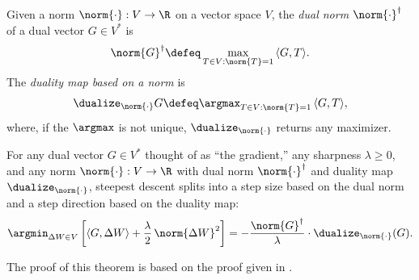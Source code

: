 \begin{definitionbox}
    \label{def:dual-norm-and-duality-map}
    Given a norm $\norm{\cdot}:V\to\R$ on a vector space $V$, the \textit{dual norm} $\norm{\cdot}^\dagger$ of a dual vector $G \in V^\ast$ is
    \begin{equation*}
    \norm{G}^\dagger \defeq \max_{T\in V:\norm{T}=1} \, \langle G, T \rangle.
    \end{equation*}
    The \textit{duality map based on a norm} is
    \begin{equation*}
    \dualize_{\norm{\cdot}} G \defeq \argmax_{T\in V:\norm{T}=1} \, \langle G, T \rangle,
    \end{equation*}
    where, if the $\argmax$ is not unique, $\dualize_{\norm{\cdot}}$ returns any maximizer.
\end{definitionbox}

\begin{theorembox}
    \label{theorem:steepest}
    For any dual vector $G \in V^\ast$ thought of as ``the gradient,'' any sharpness $\lambda \geq 0$, and any norm $\norm{\cdot}: V \to \R$ with dual norm $\norm{\cdot}^\dagger$ and duality map $\dualize_{\norm{\cdot}}$, steepest descent splits into a step size based on the dual norm and a step direction based on the duality map:
\begin{gather*}\label{eq:dual-steepest}
    \argmin_{\Delta W \in V} \left[ \langle G, \Delta W \rangle + \frac{\lambda}{2} \, \norm{\Delta W}^2 \right] = - \frac{\norm{G}^\dagger}{\lambda} \cdot \dualize_{\norm{\cdot}} (G).
\end{gather*}
\end{theorembox}

The proof of this theorem is based on the proof given in \citet{bernstein2024anthology}.

